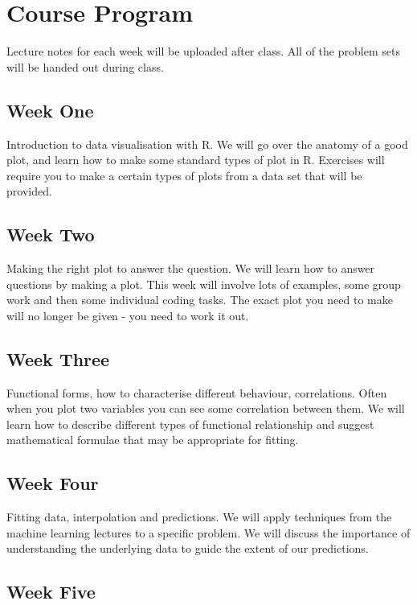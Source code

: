 \section{Course Program}


Lecture notes for each week will be uploaded after class.  All of the problem sets will be handed out during class.


\subsection*{Week One}

Introduction to data visualisation with R.  We will go over the anatomy of a good plot, and learn how to make some standard types of plot in R.  Exercises will require you to make a certain types of plots from a data set that will be provided.

\subsection*{Week Two}

Making the right plot to answer the question.  We will learn how to answer questions by making a plot.  This week will involve lots of examples, some group work and then some individual coding tasks.  The exact plot you need to make will no longer be given - you need to work it out.

\subsection*{Week Three}

Functional forms, how to characterise different behaviour, correlations.  Often when you plot two variables you can see some correlation between them.  We will learn how to describe different types of functional relationship and suggest mathematical formulae that may be appropriate for fitting.

\subsection*{Week Four}

Fitting data, interpolation and predictions.  We will apply techniques from the machine learning lectures to a specific problem.  We will discuss the importance of understanding the underlying data to guide the extent of our predictions.

\subsection*{Week Five}

